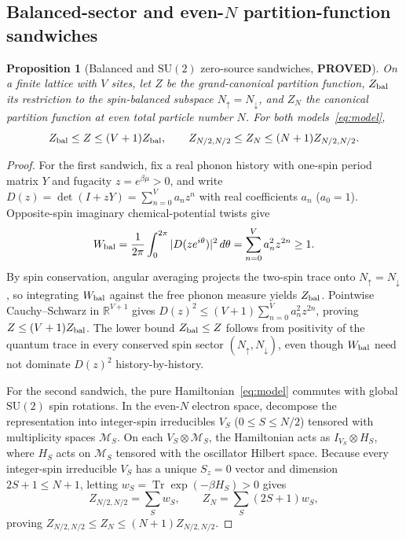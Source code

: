 \documentclass[11pt]{article}
\newtheorem{proposition}{Proposition}
\theoremstyle{remark}
\DeclareMathOperator{\Tr}{Tr}
\newcommand{\proved}{\textbf{PROVED}}
\begin{document}
\subsection{Balanced-sector and even-\texorpdfstring{$N$}{N} partition-function sandwiches}

\begin{proposition}[Balanced and $\mathrm{SU}(2)$ zero-source sandwiches, \proved]\label{prop:sandwich}
On a finite lattice with $V$ sites, let $Z$ be the grand-canonical partition function, $Z_{\rm bal}$ its restriction to the spin-balanced subspace $N_\uparrow=N_\downarrow$, and $Z_N$ the canonical partition function at even total particle number $N$. For both models~\eqref{eq:model},
\begin{equation}\label{eq:sandwiches}
 Z_{\rm bal} \le Z \le (V+1)Z_{\rm bal},\qquad
 Z_{N/2,N/2} \le Z_N \le (N+1)Z_{N/2,N/2}.
\end{equation}
\end{proposition}

\begin{proof}
For the first sandwich, fix a real phonon history with one-spin period matrix $Y$ and fugacity $z=e^{\beta\mu}>0$, and write $D(z)=\det(I+zY)=\sum_{n=0}^V a_n z^n$ with real coefficients $a_n$ ($a_0=1$). Opposite-spin imaginary chemical-potential twists give
\begin{equation}\label{eq:wbal}
 W_{\rm bal}=\frac{1}{2\pi}\int_0^{2\pi}|D(ze^{i\theta})|^2\,d\theta=\sum_{n=0}^V a_n^2 z^{2n}\ge 1.
\end{equation}
By spin conservation, angular averaging projects the two-spin trace onto $N_\uparrow=N_\downarrow$, so integrating $W_{\rm bal}$ against the free phonon measure yields $Z_{\rm bal}$. Pointwise Cauchy--Schwarz in $\mathbb R^{V+1}$ gives $D(z)^2\le (V+1)\sum_{n=0}^V a_n^2 z^{2n}$, proving $Z\le (V+1)Z_{\rm bal}$. The lower bound $Z_{\rm bal}\le Z$ follows from positivity of the quantum trace in every conserved spin sector $(N_\uparrow,N_\downarrow)$, even though $W_{\rm bal}$ need not dominate $D(z)^2$ history-by-history.

For the second sandwich, the pure Hamiltonian~\eqref{eq:model} commutes with global $\mathrm{SU}(2)$ spin rotations. In the even-$N$ electron space, decompose the representation into integer-spin irreducibles $V_S$ ($0\le S\le N/2$) tensored with multiplicity spaces $\mathcal M_S$. On each $V_S\otimes\mathcal M_S$, the Hamiltonian acts as $I_{V_S}\otimes H_S$, where $H_S$ acts on $\mathcal M_S$ tensored with the oscillator Hilbert space. Because every integer-spin irreducible $V_S$ has a unique $S_z=0$ vector and dimension $2S+1\le N+1$, letting $w_S=\Tr\exp(-\beta H_S)>0$ gives
\[
 Z_{N/2,N/2}=\sum_S w_S,\qquad Z_N=\sum_S (2S+1)w_S,
\]
proving $Z_{N/2,N/2}\le Z_N\le (N+1)Z_{N/2,N/2}$.
\end{proof}
\end{document}
